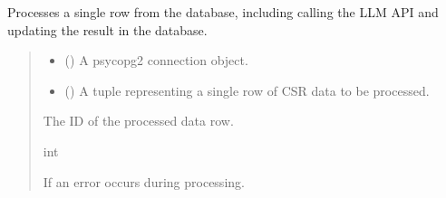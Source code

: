\documentclass[letterpaper,10pt,english]{sphinxmanual}
\begin{document}
\begin{fulllineitems}
\label{\detokenize{modules.data_storage:modules.data_storage.llm_analyse.process_row}}
\pysigstartsignatures
\pysiglinewithargsret
{}
{\sphinxparamcomma {}}
{}
\pysigstopsignatures
\sphinxAtStartPar
Processes a single row from the database, including calling the LLM API and updating the result in the database.
\begin{quote}\begin{description}
\begin{itemize}
\item {} 
\sphinxAtStartPar
{} () \textendash{} A psycopg2 connection object.

\item {} 
\sphinxAtStartPar
{} () \textendash{} A tuple representing a single row of CSR data to be processed.

\end{itemize}

\sphinxAtStartPar
The ID of the processed data row.

\sphinxAtStartPar
int

\sphinxAtStartPar
{} \textendash{} If an error occurs during processing.

\end{description}\end{quote}

\end{fulllineitems}

\end{document}
